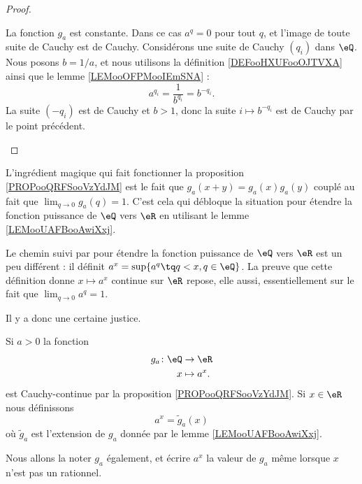 \begin{proof}
\begin{subproof}
		\spitem[Pour \( a=1\)]
		La fonction \( g_a\) est constante.
        \spitem[Pour \( a=0\)]
        Dans ce cas \( a^q=0\) pour tout \( q\), et l'image de toute suite de Cauchy est de Cauchy.
		\spitem[Pour \( 0< a<1\)]
        Considérons une suite de Cauchy \( (q_i)\) dans \( \eQ\). Nous posons \( b=1/a\), et nous utilisons la définition \ref{DEFooHXUFooOJTVXA} ainsi que le lemme \ref{LEMooOFPMooIEmSNA} :
        \begin{equation}
            a^{q_i}=\frac{1}{ b^{q_i} }=b^{-q_i}.
        \end{equation}
        La suite \( (-q_i)\) est de Cauchy et \( b>1\), donc la suite \( i\mapsto b^{-q_i}\) est de Cauchy par le point précédent.
	\end{subproof}
\end{proof}

\begin{normaltext}
	L'ingrédient magique qui fait fonctionner la proposition \ref{PROPooQRFSooVzYdJM} est le fait que \( g_a(x+y)=g_a(x)g_a(y)\) couplé au fait que \( \lim_{q\to 0} g_a(q)=1\).
	C'est cela qui débloque la situation pour étendre la fonction puissance de \( \eQ\) vers \( \eR\) en utilisant le lemme \ref{LEMooUAFBooAwiXxj}.

	Le chemin suivi par \cite{BIBooXUZHooOHWxiF} pour étendre la fonction puissance de \( \eQ\) vers \( \eR\) est un peu différent : il définit \( a^x=\sup\{ a^q\tq q<x,q\in \eQ \}\). La preuve que cette définition donne \( x\mapsto a^x\) continue sur \( \eR\) repose, elle aussi, essentiellement sur le fait que \( \lim_{q\to 0} a^q=1\).

	Il y a donc une certaine justice.
\end{normaltext}

\begin{propositionDef}  \label{DEFooOJMKooJgcCtq}
	Si \( a>0\) la fonction
	\begin{equation}
		\begin{aligned}
			g_a\colon \eQ & \to \eR      \\
			x             & \mapsto a^x.
		\end{aligned}
	\end{equation}
	est Cauchy-continue par la proposition \ref{PROPooQRFSooVzYdJM}. Si \( x\in \eR\) nous définissons
	\begin{equation}
		a^x=\tilde g_a(x)
	\end{equation}
	où \( \tilde g_a\) est l'extension de \( g_a\) donnée par le lemme \ref{LEMooUAFBooAwiXxj}.

	Nous allons la noter \( g_a\) également, et écrire \( a^x\) la valeur de \( g_a\) même lorsque \( x\) n'est pas un rationnel.
\end{propositionDef}

